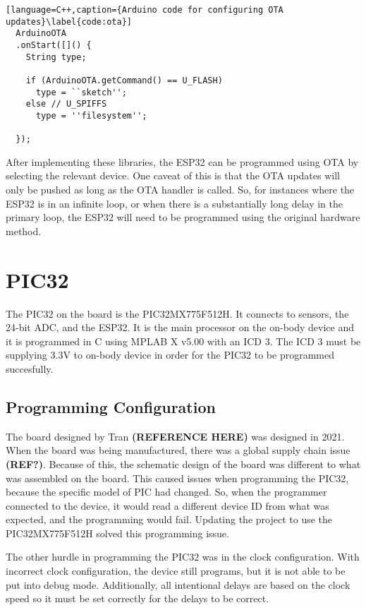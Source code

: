 \begin{lstlisting}[language=C++,caption={Arduino code for configuring OTA updates}\label{code:ota}]
  ArduinoOTA
  .onStart([]() {
    String type;

    if (ArduinoOTA.getCommand() == U_FLASH)
      type = ``sketch'';
    else // U_SPIFFS
      type = ''filesystem'';

  });

\end{lstlisting}

After implementing these libraries, the ESP32 can be programmed using OTA by selecting the relevant device.
One caveat of this is that the OTA updates will only be pushed as long as the OTA handler is called.
So, for instances where the ESP32 is in an infinite loop, or when there is a substantially long delay in the primary loop,
the ESP32 will need to be programmed using the original hardware method.


\section{PIC32}
The PIC32 on the board is the PIC32MX775F512H.
It connects to sensors, the 24-bit ADC, and the ESP32.
It is the main processor on the on-body device and it is programmed in C using MPLAB X v5.00 with an ICD 3.
The ICD 3 must be supplying 3.3V to on-body device in order for the PIC32 to be programmed succesfully.

\subsection{Programming Configuration}
The board designed by Tran \textbf{(REFERENCE HERE)} was designed in 2021.
When the board was being manufactured, there was a global supply chain issue \textbf{(REF?)}.
Because of this, the schematic design of the board was different to what was assembled on the board.
This caused issues when programming the PIC32, because the specific model of PIC had changed.
So, when the programmer connected to the device, it would read a different device ID from what was expected,
and the programming would fail.
Updating the project to use the PIC32MX775F512H solved this programming issue.

The other hurdle in programming the PIC32 was in the clock configuration.
With incorrect clock configuration, the device still programs, but it is not able to be put into debug mode.
Additionally, all intentional delays are based on the clock speed so it must be set correctly for the delays to be correct.

